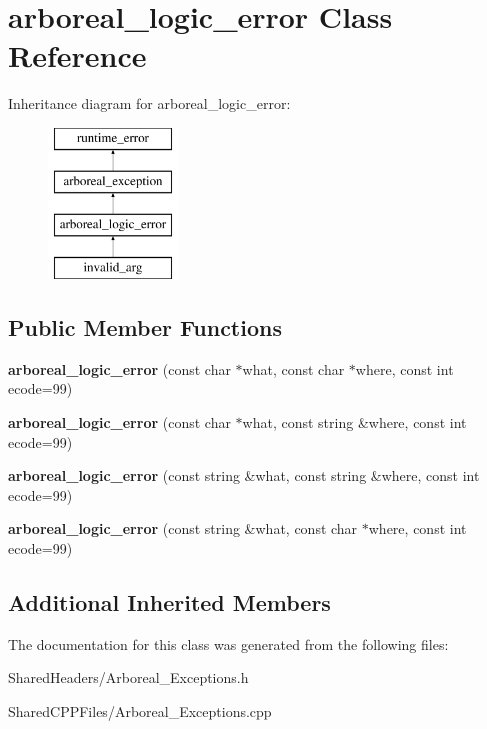 \hypertarget{classarboreal__logic__error}{}\section{arboreal\+\_\+logic\+\_\+error Class Reference}
\label{classarboreal__logic__error}
Inheritance diagram for arboreal\+\_\+logic\+\_\+error\+:\begin{figure}[H]
\begin{center}
\leavevmode
\includegraphics[height=4.000000cm]{classarboreal__logic__error}
\end{center}
\end{figure}
\subsection*{Public Member Functions}
\begin{DoxyCompactItemize}
\item 
{\bfseries arboreal\+\_\+logic\+\_\+error} (const char $\ast$what, const char $\ast$where, const int ecode=99)\hypertarget{classarboreal__logic__error_aaea786c69fe107f9b6753b51001c59d6}{}\label{classarboreal__logic__error_aaea786c69fe107f9b6753b51001c59d6}

\item 
{\bfseries arboreal\+\_\+logic\+\_\+error} (const char $\ast$what, const string \&where, const int ecode=99)\hypertarget{classarboreal__logic__error_a70b8217c9841efc9bb1e556282a89fe0}{}\label{classarboreal__logic__error_a70b8217c9841efc9bb1e556282a89fe0}

\item 
{\bfseries arboreal\+\_\+logic\+\_\+error} (const string \&what, const string \&where, const int ecode=99)\hypertarget{classarboreal__logic__error_ad7627c19a966b137cf018aa7c3075421}{}\label{classarboreal__logic__error_ad7627c19a966b137cf018aa7c3075421}

\item 
{\bfseries arboreal\+\_\+logic\+\_\+error} (const string \&what, const char $\ast$where, const int ecode=99)\hypertarget{classarboreal__logic__error_a5c589df18299902a24dae25f8a25c02a}{}\label{classarboreal__logic__error_a5c589df18299902a24dae25f8a25c02a}

\end{DoxyCompactItemize}
\subsection*{Additional Inherited Members}


The documentation for this class was generated from the following files\+:\begin{DoxyCompactItemize}
\item 
Shared\+Headers/Arboreal\+\_\+\+Exceptions.\+h\item 
Shared\+C\+P\+P\+Files/Arboreal\+\_\+\+Exceptions.\+cpp\end{DoxyCompactItemize}
